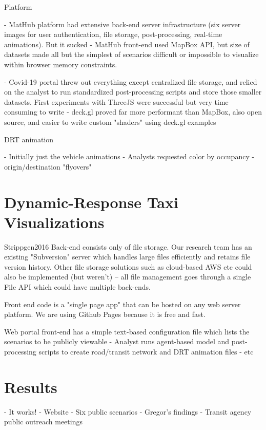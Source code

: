 \documentclass[3p,times,procedia]{elsarticle}
\begin{document}
Platform

- MatHub platform had extensive back-end server infrastructure (six server images for user authentication, file storage, post-processing, real-time animations). But it sucked
- MatHub front-end used MapBox API, but size of datasets made all but the simplest of scenarios difficult or impossible to visualize within browser memory constraints.

- Covid-19 portal threw out everything except centralized file storage, and relied on the analyst to run standardized post-processing scripts and store those smaller datasets. First experiments with ThreeJS were successful but very time consuming to write
- deck.gl proved far more performant than MapBox, also open source, and easier to write custom "shaders" using deck.gl examples

DRT animation

- Initially just the vehicle animations
- Analysts requested color by occupancy
- origin/destination "flyovers"


\section{Dynamic-Response Taxi Visualizations}
\label{drtviz}

{Strippgen2016}
Back-end consists only of file storage. Our research team has an existing "Subversion" server which handles large files efficiently and retains file version history. Other file storage solutions such as cloud-based AWS etc could also be implemented (but weren't) -- all file management goes through a single File API which could have multiple back-ends.

Front end code is a "single page app" that can be hosted on any web server platform. We are using Github Pages because it is free and fast.

Web portal front-end has a simple text-based configuration file which lists the scenarios to be publicly viewable
- Analyst runs agent-based model and post-processing scripts to create road/transit network and DRT animation files
- etc

\section{Results}
\label{results}

- It works!
- Website
- Six public scenarios
- Gregor's findings
- Transit agency public outreach meetings
\end{document}
